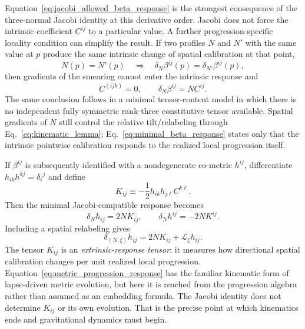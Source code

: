 \documentclass[11pt]{article}
\begin{document}
Equation~\eqref{eq:jacobi_allowed_beta_response} is the strongest consequence of the three-normal Jacobi identity at this derivative order. Jacobi does not force the intrinsic coefficient $C^{ij}$ to a particular value. A further progression-specific locality condition can simplify the result. If two profiles $N$ and $N'$ with the same value at $p$ produce the same intrinsic change of spatial calibration at that point,
\begin{equation}
    N(p)=N'(p)
    \quad\Longrightarrow\quad
    \delta_N\beta^{ij}(p)=\delta_{N'}\beta^{ij}(p),
    \label{eq:pointwise_progression_locality}
\end{equation}
then gradients of the smearing cannot enter the intrinsic response and
\begin{equation}
    \boxed{C^{(ijk)}=0,\qquad
    \delta_N\beta^{ij}=NC^{ij}.}
    \label{eq:minimal_beta_response}
\end{equation}
The same conclusion follows in a minimal tensor-content model in which there is no independent fully symmetric rank-three constitutive tensor available. Spatial gradients of $N$ still control the relative tilt/relabeling through Eq.~\eqref{eq:kinematic_lemma}; Eq.~\eqref{eq:minimal_beta_response} states only that the intrinsic pointwise calibration responds to the realized local progression itself.

If $\beta^{ij}$ is subsequently identified with a nondegenerate co-metric $h^{ij}$, differentiate $h_{ik}h^{kj}=\delta_i{}^j$ and define
\begin{equation}
    K_{ij}
    \equiv
    -\frac12 h_{ik}h_{j\ell}C^{k\ell}.
    \label{eq:K_from_C}
\end{equation}
Then the minimal Jacobi-compatible response becomes
\begin{equation}
    \boxed{
    \delta_N h_{ij}=2NK_{ij},
    \qquad
    \delta_N h^{ij}=-2NK^{ij}.}
    \label{eq:metric_progression_response}
\end{equation}
Including a spatial relabeling gives
\begin{equation}
    \delta_{(N,\xi)}h_{ij}
    =2NK_{ij}+\mathcal L_\xi h_{ij}.
    \label{eq:metric_progression_shift}
\end{equation}
The tensor $K_{ij}$ is an \emph{extrinsic-response tensor}: it measures how directional spatial calibration changes per unit realized local progression. Equation~\eqref{eq:metric_progression_response} has the familiar kinematic form of lapse-driven metric evolution, but here it is reached from the progression algebra rather than assumed as an embedding formula. The Jacobi identity does not determine $K_{ij}$ or its own evolution. That is the precise point at which kinematics ends and gravitational dynamics must begin.
\end{document}
